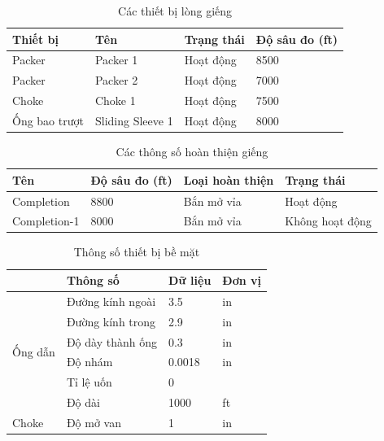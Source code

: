 \documentclass[12pt,a4paper]{report}
\begin{document}
\begin{table}[h]
\caption{Các thiết bị lòng giếng}\label{tab:downhole_equipment}
\begin{tabularx}{\textwidth}{@{}XXXX@{}}
\toprule
Thiết bị      & Tên              & Trạng thái & Độ sâu đo (ft) \\ \midrule
Packer        & Packer 1         & Hoạt động  & 8500           \\
Packer        & Packer 2         & Hoạt động  & 7000           \\
Choke         & Choke 1          & Hoạt động  & 7500           \\
Ống bao trượt & Sliding Sleeve 1 & Hoạt động  & 8000           \\ \bottomrule
\end{tabularx}
\end{table}

\clearpage

\begin{table}[h]
\caption{Các thông số hoàn thiện giếng}\label{tab:well_completion}
\begin{tabularx}{\textwidth}{@{}XXXX@{}}
\toprule
Tên          & Độ sâu đo (ft) & Loại hoàn thiện & Trạng thái \\ \midrule
Completion   & 8800           & Bắn mở vỉa      & Hoạt động  \\
Completion-1 & 8000           & Bắn mở vỉa      & Không hoạt động  \\ \bottomrule
\end{tabularx}
\end{table}

\begin{table}[h]
\caption{Thông số thiết bị bề mặt}\label{tab:surface_equipment}
\begin{tabularx}{\textwidth}{@{}XXXX@{}}
\toprule
                         & Thông số         & Dữ liệu & Đơn vị \\ \midrule
\multirow{6}{*}{Ống dẫn} & Đường kính ngoài & 3.5     & in     \\
                         & Đường kính trong & 2.9     & in     \\
                         & Độ dày thành ống & 0.3     & in     \\
                         & Độ nhám          & 0.0018  & in     \\
                         & Tỉ lệ uốn        & 0       &        \\
                         & Độ dài           & 1000    & ft     \\
Choke                    & Độ mở van        & 1       & in     \\ \bottomrule
\end{tabularx}
\end{table}
\end{document}
